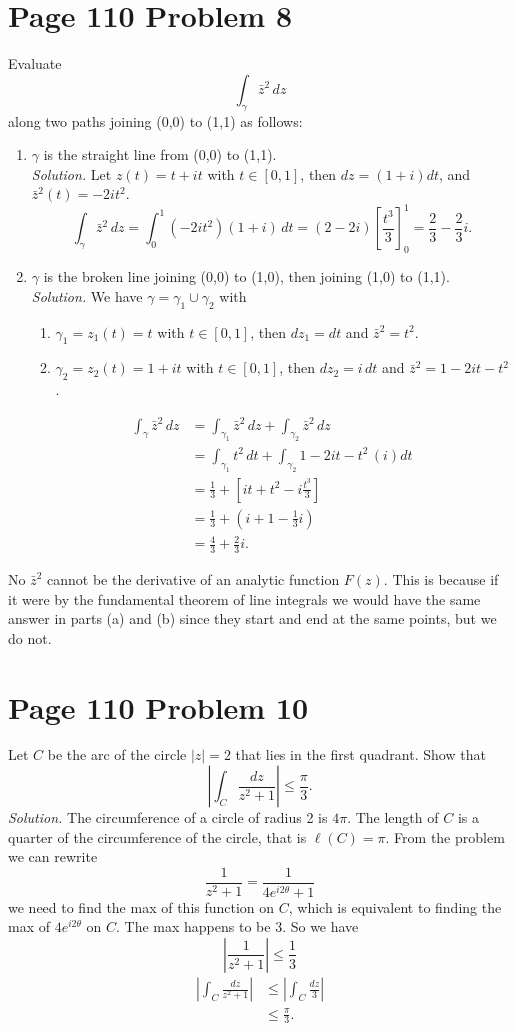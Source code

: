 \documentclass[12pt]{article}
\begin{document}
\section*{Page 110 Problem 8} Evaluate
\[
    \int_{\gamma}\bar{z}^2\,dz
\]
along two paths joining (0,0) to (1,1) as follows:
\begin{enumerate}[label=(\alph*)] 
    \item $\gamma$ is the straight line from (0,0) to (1,1).\\
    \textit{Solution.} Let $z(t)=t+it$ with $t\in[0,1]$, then $dz=(1+i)dt$, and $\bar{z}^2(t)=-2it^2$.
    \[
        \int_{\gamma}\bar{z}^2\,dz=\int_{0}^{1}(-2it^2)(1+i)\,dt=(2-2i)\left[\frac{t^3}{3}\right]_0^1=\frac{2}{3}-\frac{2}{3}i.
    \]
    \item $\gamma$ is the broken line joining (0,0) to (1,0), then joining (1,0) to (1,1).\\
    \textit{Solution.} We have $\gamma=\gamma_1\cup\gamma_2$ with
    \begin{enumerate}
        \item $\gamma_1=z_1(t)=t$ with $t\in[0,1]$, then $dz_1=dt$ and $\bar{z}^2=t^2$.
        \item $\gamma_2=z_2(t)=1+it$ with $t\in[0,1]$, then $dz_2=i\,dt$ and $\bar{z}^2=1-2it-t^2$. 
    \end{enumerate}
    \begin{align*}
        \int_{\gamma}\bar{z}^2\,dz&=\int_{\gamma_1}\bar{z}^2\,dz+\int_{\gamma_2}\bar{z}^2\,dz\\
        &=\int_{\gamma_1}t^2\,dt+\int_{\gamma_2}1-2it-t^2\,(i)dt\\
        &=\frac{1}{3}+\left[it+t^2-i\frac{t^3}{3}\right]\\
        &=\frac{1}{3}+\left(i+1-\frac{1}{3}i\right)\\
        &=\frac{4}{3}+\frac{2}{3}i.
    \end{align*}
\end{enumerate}
No $\bar{z}^2$ cannot be the derivative of an analytic function $F(z)$. This is because if it were by the fundamental theorem of line integrals we would have the same answer in parts (a) and (b) since they start and end at the same points, but we do not.
\section*{Page 110 Problem 10} Let $C$ be the arc of the circle $|z|=2$ that lies in the first quadrant. Show that
\[
    \left|\int_C\frac{dz}{z^2+1}\right|\leq\frac{\pi}{3}.
\]
\textit{Solution.} The circumference of a circle of radius 2 is $4\pi$. The length of $C$ is a quarter of the circumference of the circle, that is $\ell(C)=\pi$. From the problem we can rewrite
\[
    \frac{1}{z^2+1}=\frac{1}{4e^{i2\theta}+1}
\]
we need to find the max of this function on $C$, which is equivalent to finding the max of $4e^{i2\theta}$ on $C$. The max happens to be 3. So we have
\[
    \left|\frac{1}{z^2+1}\right|\leq\frac{1}{3}
\] 
\begin{align*}
    \left|\int_C\frac{dz}{z^2+1}\right|&\leq\left|\int_C\frac{dz}{3}\right|\\
    &\leq\frac{\pi}{3}.
\end{align*}
\newpage
{}
\end{document}
